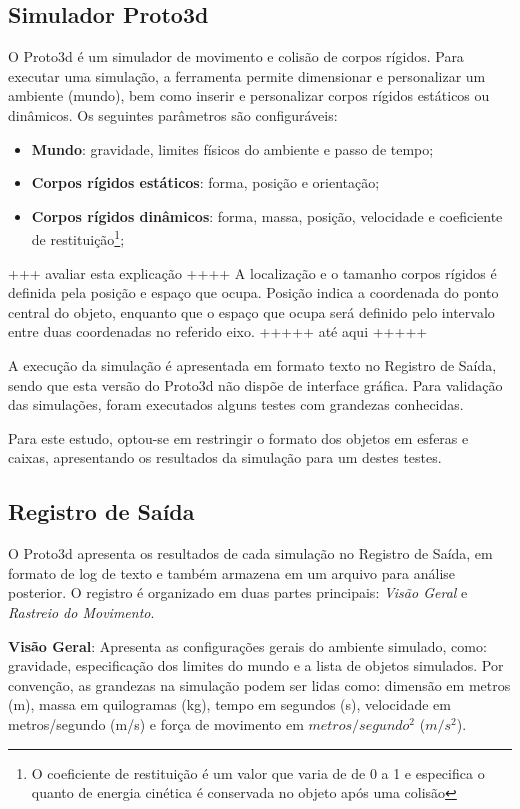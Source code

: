 \documentclass[12pt]{article}
\begin{document}
\subsection{Simulador Proto3d}
O Proto3d é um simulador de movimento e colisão de corpos rígidos. Para executar uma simulação, a ferramenta permite dimensionar e personalizar um ambiente (mundo), bem como inserir e personalizar corpos rígidos estáticos ou dinâmicos. Os seguintes parâmetros são configuráveis:
\begin{itemize}
	\item \textbf{Mundo}: gravidade, limites físicos do ambiente e passo de tempo;
	\item \textbf{Corpos rígidos estáticos}: forma, posição e orientação;
	\item \textbf{Corpos rígidos dinâmicos}: forma, massa, posição, velocidade e coeficiente de restituição\footnote{O coeficiente de restituição é um valor que varia de de 0 a 1 e especifica o quanto de energia cinética é conservada no objeto após uma colisão};
\end{itemize}

+++ avaliar esta explicação ++++
A localização e o tamanho corpos rígidos é definida pela posição e espaço que ocupa. Posição indica a coordenada do ponto central do objeto, enquanto que o espaço que ocupa será definido pelo intervalo entre duas coordenadas no referido eixo.
+++++ até aqui +++++

A execução da simulação é apresentada em formato texto no Registro de Saída, sendo que esta versão do Proto3d não dispõe de interface gráfica. Para validação das simulações, foram executados alguns testes com grandezas conhecidas. 

Para este estudo, optou-se em restringir o formato dos objetos em esferas e caixas, apresentando os resultados da simulação para um destes testes.

\subsection{Registro de Saída}
O Proto3d apresenta os resultados de cada simulação no Registro de Saída, em formato de log de texto e também armazena em um arquivo para análise posterior. O registro é organizado em duas partes principais: \emph{Visão Geral} e \emph{Rastreio do Movimento}.

\textbf{Visão Geral}: Apresenta as configurações gerais do ambiente simulado, como: gravidade, especificação dos limites do mundo e a lista de objetos simulados. Por convenção, as grandezas na simulação podem ser lidas como: dimensão em metros (m), massa em quilogramas (kg), tempo em segundos (s), velocidade em metros/segundo (m/s) e força de movimento em $metros/segundo^{2}$ ($m/s^{2}$).
\end{document}

